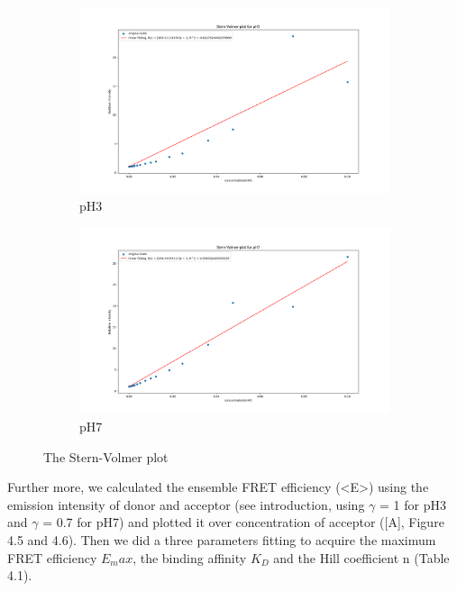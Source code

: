 \documentclass[a4paper,english,12pt,bibliography=totoc]{scrreprt}
\begin{document}
\begin{figure}[htbp]
    \centering
    \begin{subfigure}[b]{0.45\textwidth}
        \includegraphics[width=\textwidth]{Figures/SV plot ph3.png}
        \caption{pH3}
    \end{subfigure}
    \quad %
    \begin{subfigure}[b]{0.45\textwidth}
        \includegraphics[width=\textwidth]{Figures/SV plot ph7.png}
        \caption{pH7}
    \end{subfigure}
    \caption{The Stern-Volmer plot}
\end{figure}

Further more, we calculated the ensemble FRET efficiency (<E>) using the emission intensity of donor and acceptor (see introduction, using $\gamma$ = 1 for pH3 and $\gamma$ = 0.7 for pH7) and plotted it over concentration of acceptor ([A], Figure 4.5 and 4.6). Then we did a three parameters fitting to acquire the maximum FRET efficiency $E_max$, the binding affinity $K_D$ and the Hill coefficient n (Table 4.1).
\end{document}

